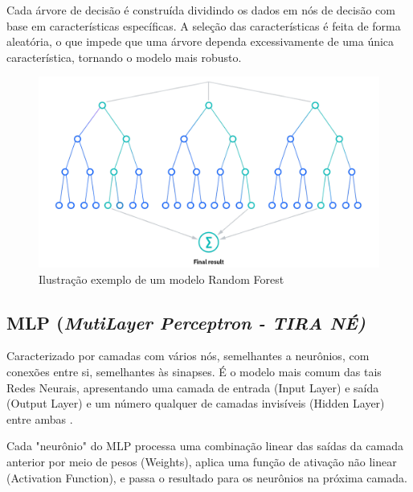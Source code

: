 Cada árvore de decisão é construída dividindo os dados em nós de decisão com base em características específicas. A seleção das características é feita de forma aleatória, o que impede que uma árvore dependa excessivamente de uma única característica, tornando o modelo mais robusto.

\begin{figure}[htb]
	\centering
	\begin{minipage}{0.9\linewidth}
		\centering
		\includegraphics[width=\linewidth]{tg1/figuras/random.png}
		\caption{Ilustração exemplo de um modelo Random Forest
            \cite{rf_fig}} \label{fig:rfmodel}
	\end{minipage}
\end{figure}

\subsection{\textbf{MLP (\textit{MutiLayer Perceptron - TIRA NÉ)}}}

Caracterizado por camadas com vários nós, semelhantes a neurônios,
com conexões entre si, semelhantes às sinapses. É o modelo mais comum das tais Redes Neurais, apresentando uma camada de entrada (Input Layer) e saída (Output Layer) e um número qualquer de camadas invisíveis (Hidden Layer) entre ambas \cite{hastie_09_elements-of.statistical-learning}.

Cada "neurônio" do MLP processa uma combinação linear das saídas da camada anterior por meio de pesos (Weights), aplica uma função de ativação não linear (Activation Function), e passa o resultado para os neurônios na próxima camada.

